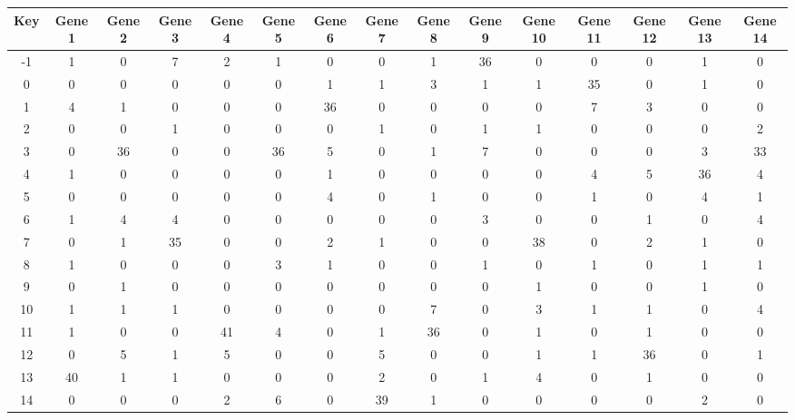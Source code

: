 \begin{tabular}{|c|c|c|c|c|c|c|c|c|c|c|c|c|c|c|}
\hline
Key & Gene 1 & Gene 2 & Gene 3 & Gene 4 & Gene 5 & Gene 6 & Gene 7 & Gene 8 & Gene 9 & Gene 10 & Gene 11 & Gene 12 & Gene 13 & Gene 14 \\
\hline
-1 & 1 & 0 & 7 & 2 & 1 & 0 & 0 & 1 & 36 & 0 & 0 & 0 & 1 & 0 \\
0 & 0 & 0 & 0 & 0 & 0 & 1 & 1 & 3 & 1 & 1 & 35 & 0 & 1 & 0 \\
1 & 4 & 1 & 0 & 0 & 0 & 36 & 0 & 0 & 0 & 0 & 7 & 3 & 0 & 0 \\
2 & 0 & 0 & 1 & 0 & 0 & 0 & 1 & 0 & 1 & 1 & 0 & 0 & 0 & 2 \\
3 & 0 & 36 & 0 & 0 & 36 & 5 & 0 & 1 & 7 & 0 & 0 & 0 & 3 & 33 \\
4 & 1 & 0 & 0 & 0 & 0 & 1 & 0 & 0 & 0 & 0 & 4 & 5 & 36 & 4 \\
5 & 0 & 0 & 0 & 0 & 0 & 4 & 0 & 1 & 0 & 0 & 1 & 0 & 4 & 1 \\
6 & 1 & 4 & 4 & 0 & 0 & 0 & 0 & 0 & 3 & 0 & 0 & 1 & 0 & 4 \\
7 & 0 & 1 & 35 & 0 & 0 & 2 & 1 & 0 & 0 & 38 & 0 & 2 & 1 & 0 \\
8 & 1 & 0 & 0 & 0 & 3 & 1 & 0 & 0 & 1 & 0 & 1 & 0 & 1 & 1 \\
9 & 0 & 1 & 0 & 0 & 0 & 0 & 0 & 0 & 0 & 1 & 0 & 0 & 1 & 0 \\
10 & 1 & 1 & 1 & 0 & 0 & 0 & 0 & 7 & 0 & 3 & 1 & 1 & 0 & 4 \\
11 & 1 & 0 & 0 & 41 & 4 & 0 & 1 & 36 & 0 & 1 & 0 & 1 & 0 & 0 \\
12 & 0 & 5 & 1 & 5 & 0 & 0 & 5 & 0 & 0 & 1 & 1 & 36 & 0 & 1 \\
13 & 40 & 1 & 1 & 0 & 0 & 0 & 2 & 0 & 1 & 4 & 0 & 1 & 0 & 0 \\
14 & 0 & 0 & 0 & 2 & 6 & 0 & 39 & 1 & 0 & 0 & 0 & 0 & 2 & 0 \\
\hline
\end{tabular}